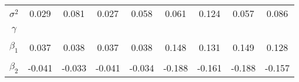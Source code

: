 \begin{footnotesize}
\begin{singlespace}
\begin{tabular}{ccccccccc}
$ \sigma^{2} $ & 0.029 & 0.081 & 0.027 & 0.058 & 0.061 & 0.124 & 0.057 & 0.086 \\ 
 & \begin{tiny} [0.02,0.04] \end{tiny}  & \begin{tiny} [0.061,0.105] \end{tiny}  & \begin{tiny} [0.018,0.039] \end{tiny}  & \begin{tiny} [0.043,0.075] \end{tiny}  & \begin{tiny} [0.051,0.078] \end{tiny}  & \begin{tiny} [0.105,0.142] \end{tiny}  & \begin{tiny} [0.046,0.068] \end{tiny}  & \begin{tiny} [0.072,0.101] \end{tiny}  \\ 
$\gamma$ &  &  &  &  &  &  &  &  \\ 
 &  &  &  &  &  &  &  &  \\ 
$ \beta_{1} $ & 0.037 & 0.038 & 0.037 & 0.038 & 0.148 & 0.131 & 0.149 & 0.128 \\ 
 & \begin{tiny} [-0.052,0.13] \end{tiny}  & \begin{tiny} [-0.032,0.106] \end{tiny}  & \begin{tiny} [-0.056,0.13] \end{tiny}  & \begin{tiny} [-0.032,0.107] \end{tiny}  & \begin{tiny} [0.089,0.207] \end{tiny}  & \begin{tiny} [0.089,0.175] \end{tiny}  & \begin{tiny} [0.09,0.206] \end{tiny}  & \begin{tiny} [0.086,0.171] \end{tiny}  \\ 
$ \beta_{2} $ & -0.041 & -0.033 & -0.041 & -0.034 & -0.188 & -0.161 & -0.188 & -0.157 \\ 

\end{tabular}
\end{singlespace}
\end{footnotesize}
